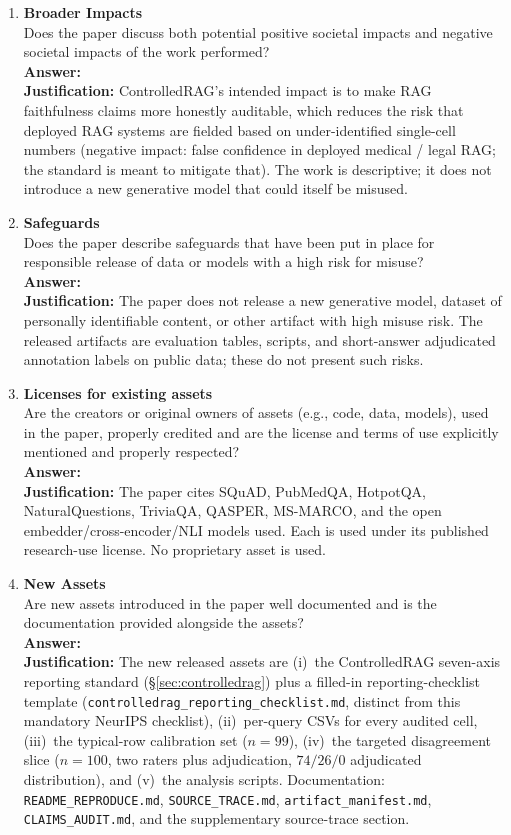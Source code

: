 \begin{enumerate}
\item {\bf Broader Impacts}\\
Does the paper discuss both potential positive societal impacts and
negative societal impacts of the work performed?
\\\textbf{Answer: \answerYes{}}
\\\textbf{Justification:} ControlledRAG's intended impact is to make
RAG faithfulness claims more honestly auditable, which reduces the
risk that deployed RAG systems are fielded based on under-identified
single-cell numbers (negative impact: false confidence in deployed
medical / legal RAG; the standard is meant to mitigate that). The
work is descriptive; it does not introduce a new generative model
that could itself be misused.

\item {\bf Safeguards}\\
Does the paper describe safeguards that have been put in place for
responsible release of data or models with a high risk for misuse?
\\\textbf{Answer: \answerNA{}}
\\\textbf{Justification:} The paper does not release a new generative
model, dataset of personally identifiable content, or other artifact
with high misuse risk. The released artifacts are evaluation tables,
scripts, and short-answer adjudicated annotation labels on public
data; these do not present such risks.

\item {\bf Licenses for existing assets}\\
Are the creators or original owners of assets (e.g., code, data,
models), used in the paper, properly credited and are the license and
terms of use explicitly mentioned and properly respected?
\\\textbf{Answer: \answerYes{}}
\\\textbf{Justification:} The paper cites SQuAD, PubMedQA, HotpotQA,
NaturalQuestions, TriviaQA, QASPER, MS-MARCO, and the open
embedder/cross-encoder/NLI models used. Each is used under its
published research-use license. No proprietary asset is used.

\item {\bf New Assets}\\
Are new assets introduced in the paper well documented and is the
documentation provided alongside the assets?
\\\textbf{Answer: \answerYes{}}
\\\textbf{Justification:} The new released assets are
(i)~the ControlledRAG seven-axis reporting standard
(\S\ref{sec:controlledrag}) plus a filled-in reporting-checklist
template
(\texttt{controlledrag\_reporting\_checklist.md},
distinct from this mandatory NeurIPS checklist),
(ii)~per-query CSVs for every audited cell,
(iii)~the typical-row calibration set ($n{=}99$),
(iv)~the targeted disagreement slice ($n{=}100$, two raters plus
adjudication, $74/26/0$ adjudicated distribution),
and (v)~the analysis scripts. Documentation:
\texttt{README\_REPRODUCE.md},
\texttt{SOURCE\_TRACE.md},
\texttt{artifact\_manifest.md},
\texttt{CLAIMS\_AUDIT.md},
and the supplementary source-trace section.


\end{enumerate}
